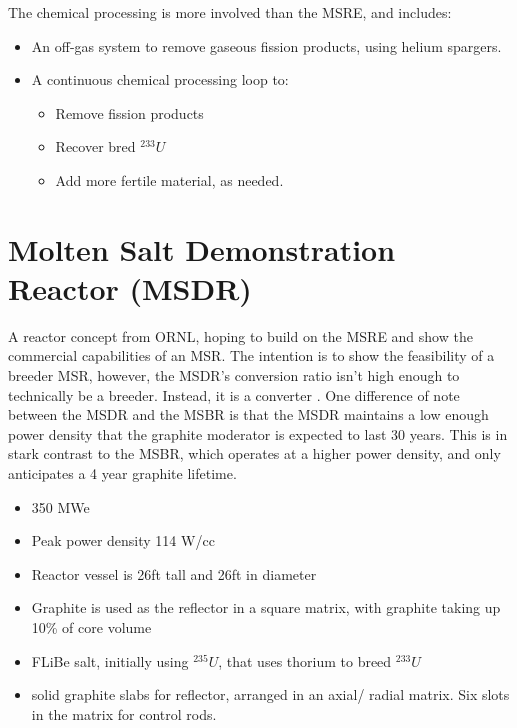 \documentclass[letterpaper]{article}
\begin{document}
The chemical processing is more involved than the MSRE, and includes:
\begin{itemize}
\item An off-gas system to remove gaseous fission products, using helium spargers.
\item A continuous chemical processing loop to:
	\begin{itemize}
	\item Remove fission products
	\item Recover bred ${}^{233}U$
	\item Add more fertile material, as needed.
	\end{itemize}
\end{itemize}

\section{Molten Salt Demonstration Reactor (MSDR)}
A reactor concept from ORNL, hoping to build on the MSRE and show the commercial capabilities of an MSR.  The intention is to show the feasibility of a breeder MSR, however, the MSDR's conversion ratio isn't high enough to technically be a breeder.  Instead, it is a converter \cite{bettis_design_1972}.  One difference of note between the MSDR and the MSBR is that the  MSDR maintains a low enough power density that the graphite moderator is expected to last 30 years.  This is in stark contrast to the MSBR, which operates at a higher power density, and only anticipates a 4 year graphite lifetime.

\begin{itemize}
\item 350 MWe
\item Peak power density 114 W/cc
\item Reactor vessel is 26ft tall and 26ft in diameter
\item Graphite is used as the reflector in a square matrix, with graphite taking up 10\% of core volume
\item FLiBe salt, initially using ${}^{235}U$, that uses thorium to breed ${}^{233}U$
\item solid graphite slabs for reflector, arranged in an axial/ radial matrix.  Six slots in the matrix for control rods.
\end{itemize}
\end{document}
